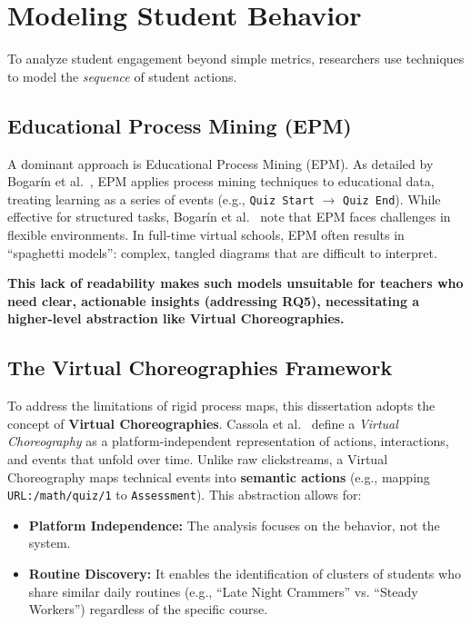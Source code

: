 \section{Modeling Student Behavior}
\label{sec:modeling}
To analyze student engagement beyond simple metrics, researchers use techniques to model the \emph{sequence} of student actions.

\subsection{Educational Process Mining (EPM)}
A dominant approach is Educational Process Mining (EPM). As detailed by Bogarín et al.~\cite{bogarin_survey_2018}, EPM applies process mining techniques to educational data, treating learning as a series of events (e.g., \texttt{Quiz Start} $\rightarrow$ \texttt{Quiz End}).
While effective for structured tasks, Bogarín et al.~\cite{bogarin_survey_2018} note that EPM faces challenges in flexible environments.
In full-time virtual schools, EPM often results in ``spaghetti models'': complex, tangled diagrams that are difficult to interpret. 

\textbf{This lack of readability makes such models unsuitable for teachers who need clear, actionable insights (addressing RQ5), necessitating a higher-level abstraction like Virtual Choreographies.}

\subsection{The Virtual Choreographies Framework}
To address the limitations of rigid process maps, this dissertation adopts the concept of \textbf{Virtual Choreographies}.
Cassola et al.~\cite{cassola_using_2022} define a \emph{Virtual Choreography} as a platform-independent representation of actions, interactions, and events that unfold over time.
Unlike raw clickstreams, a Virtual Choreography maps technical events into \textbf{semantic actions} (e.g., mapping \texttt{URL:/math/quiz/1} to \texttt{Assessment}).
This abstraction allows for:
\begin{itemize}
    \item \textbf{Platform Independence:} The analysis focuses on the behavior, not the system.
    \item \textbf{Routine Discovery:} It enables the identification of clusters of students who share similar daily routines (e.g., ``Late Night Crammers'' vs. ``Steady Workers'') regardless of the specific course.
\end{itemize}

